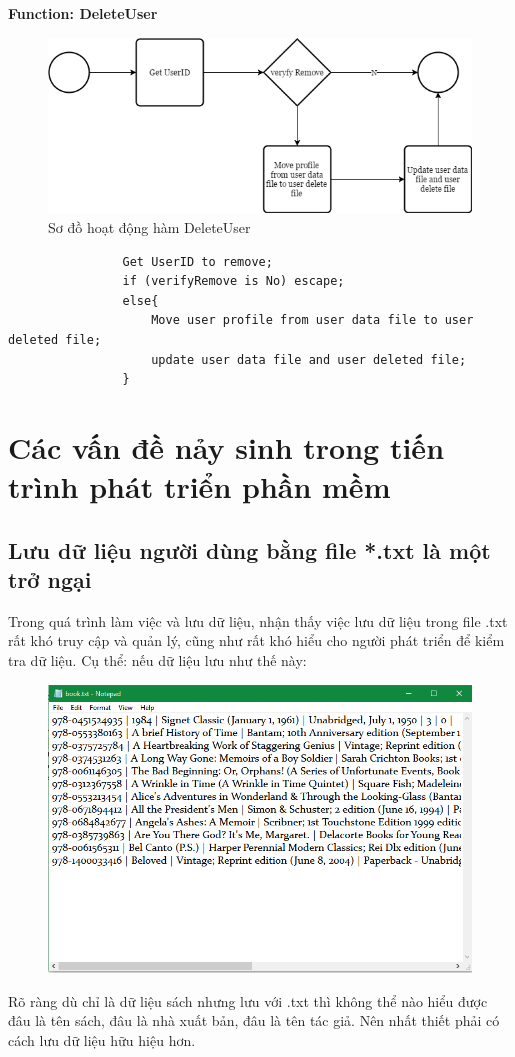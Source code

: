 \documentclass[12pt,a4paper]{report}
\begin{document}
                \newpage
                \textbf{Function: DeleteUser}
                \begin{figure}[H]
                    \centering
                    \label{F:deleteuser}
                    \includegraphics[scale = .4]{deleteuser.png}
                    \caption{Sơ đồ hoạt động hàm DeleteUser}
                \end{figure}
                \begin{verbatim}
                Get UserID to remove;
                if (verifyRemove is No) escape;
                else{
                    Move user profile from user data file to user deleted file;
                    update user data file and user deleted file;
                }
                \end{verbatim}
\chapter{Các vấn đề nảy sinh trong tiến trình phát triển phần mềm}
    \section{Lưu dữ liệu người dùng bằng file *.txt là một trở ngại}
    Trong quá trình làm việc và lưu dữ liệu, nhận thấy việc lưu dữ liệu trong file .txt rất khó truy cập và quản lý, cũng như rất khó hiểu cho người phát triển để kiểm tra dữ liệu. Cụ thể: nếu dữ liệu lưu như thế này:
        \begin{figure}[H]
            \centering
            \label{F:booktext}
            \includegraphics[scale = .7]{booktext.png}
        \end{figure}
    Rõ ràng dù chỉ là dữ liệu sách nhưng lưu với .txt thì không thể nào hiểu được đâu là tên sách, đâu là nhà xuất bản, đâu là tên tác giả. Nên nhất thiết phải có cách lưu dữ liệu hữu hiệu hơn.\\
\end{document}
